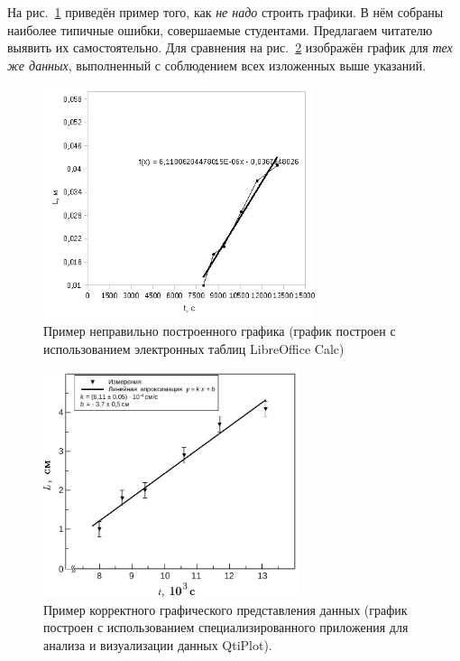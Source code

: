 \documentclass[10pt]{article}
\begin{document}
На рис.~\ref{fig:incorrect} приведён пример того, как \emph{не надо}
строить графики. В нём собраны наиболее типичные ошибки, совершаемые
студентами. Предлагаем читателю выявить их самостоятельно. Для сравнения
на рис.~\ref{fig:correct} изображён график для \emph{тех же данных},
выполненный с соблюдением всех изложенных выше указаний.
\begin{figure}[ht]
\begin{centering}
\includegraphics[width=8cm]{images/bad.png}
\par\end{centering}
\caption{\label{fig:incorrect}Пример неправильно построенного графика (график
построен с использованием электронных таблиц LibreOffice Calc)}
\end{figure}
\begin{figure}[h!]
\begin{centering}
\includegraphics[width=7.5cm]{images/good.pdf}
\par\end{centering}
\caption{\label{fig:correct}Пример корректного графического представления
данных (график построен с использованием специализированного приложения
для анализа и визуализации данных QtiPlot).}
\end{figure}
\end{document}
